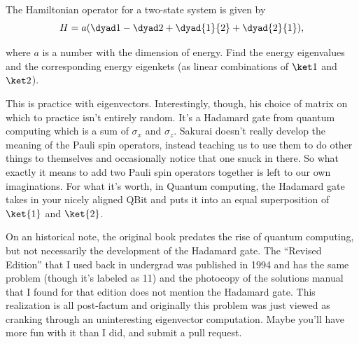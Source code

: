 \begin{question}

  The Hamiltonian operator for a two-state system is given by
  \begin{equation*}
    H = a(\dyad 1 - \dyad 2 + \dyad{1}{2} + \dyad{2}{1}),
  \end{equation*}

  where $a$ is a number with the dimension of energy. Find the energy
  eigenvalues and the corresponding energy eigenkets (as linear
  combinations of $\ket 1$ and $\ket 2$).
\end{question}

\begin{purpose}
  This is practice with eigenvectors.  Interestingly, though, his
  choice of matrix on which to practice isn't entirely random.  It's a
  Hadamard gate from quantum computing which is a sum of $\sigma_x$
  and $\sigma_z$.  Sakurai doesn't really develop the meaning of the
  Pauli spin operators, instead teaching us to use them to do other
  things to themselves and occasionally notice that one snuck in
  there.  So what exactly it means to add two Pauli spin operators
  together is left to our own imaginations.  For what it's worth, in
  Quantum computing, the Hadamard gate takes in your nicely aligned
  QBit and puts it into an equal superposition of $\ket{1}$ and
  $\ket{2}$.

  On an historical note, the original book predates the rise of
  quantum computing, but not necessarily the development of the
  Hadamard gate.  The ``Revised Edition'' that I used back in
  undergrad was published in 1994 and has the same problem (though
  it's labeled as 11) and the photocopy of the solutions manual that I
  found for that edition does not mention the Hadamard gate.  This
  realization is all post-factum and originally this problem was just
  viewed as cranking through an uninteresting eigenvector computation.
  Maybe you'll have more fun with it than I did, and submit a pull
  request.
\end{purpose}

